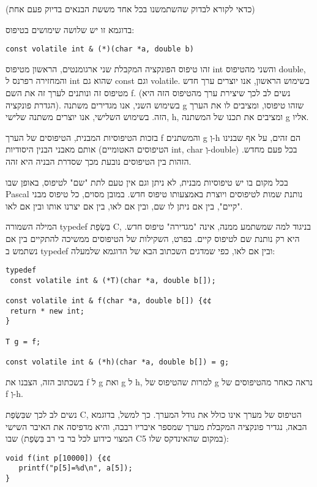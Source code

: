       (כדאי לקורא לבדוק שהשתמשנו בכל אחד מששת הבנאים בדיוק פעם אחת)

      בדוגמא זו יש שלושה שימושים בטיפוס:

\begin{verbatim}
const volatile int & (*)(char *a, double b)
\end{verbatim}

      זהו טיפוס הפונקציה המקבלת שני ארגומנטים, הראשון מטיפוס int והשני מהטיפוס double, והמחזירה רפרנס ל int שהוא גם const וגם volatile. בשימוש הראשון, אנו יוצרים ערך חדש מטיפוס זה ונותנים לערך זה את השם f. (נשים לב לכך שיצירת ערך מהטיפוס הזה היא הגדרת פונקציה). בשימוש השני, אנו מגדירים משתנה g שזהו טיפוסו, ומציבים לו את הערך הזה. בשימוש השלישי, אנו יוצרים משתנה שלישי, h, ומציבים את תכנו של המשתנה g אליו.

      בזכות הטיפוסיות המבנית, הטיפוסים של הערך f והמשתנים g וְ-h הם זהים, על אף שבנינו אותם מאבני הבנין היסודיות (הטיפוסים האטומיים int, char וְ-double) בכל פעם מחדש. הזהות בין הטיפוסים נובעת מכך שסדרת הבניה היא זהה.

      בכל מקום בו יש טיפוסיות מבנית, לא ניתן וגם אין טעם לתת "שם" לטיפוס, באופן שבו Pascal נותנת שמות לטיפוסים ויוצרת באמצעותו טיפוס חדש. במובן מסוים, כל טיפוס מבני "קיים", בין אם ניתן לו שם, ובין אם לאו, בין אם יצרנו אותו ובין אם לאו.

      המילה השמורה typedef בִּשְׂפַת C, בניגוד למה שמשתמע ממנה, אינה "מגדירה" טיפוס חדש. היא רק נותנת שם לטיפוס קיים. בפרט, השקילות של הטיפוסים ממשיכה להתקיים בין אם נשתמש ב typedef ובין אם לאו, כפי שמדגים השכתוב הבא של הדוגמא שלמעלה:

\begin{verbatim}
typedef
 const volatile int & (*T)(char *a, double b[]);

const volatile int & f(char *a, double b[]) {¢¢
 return * new int;
}

T g = f;

const volatile int & (*h)(char *a, double b[]) = g;
\end{verbatim}

      בשכתוב הזה, הצבנו את f ל g ואת g ל h, למרות שהטיפוס של g נראה כאחר מהטיפוסים של f וְ-h.

      נשים לב לכך שבִּשְׂפַת C, הטיפוס של מערך אינו כולל את גודל המערך. כך למשל, בדוגמא הבאה, נגדיר פונקציה המקבלת מערך שמספר איבריו רבבה, והיא מדפיסה את האיבר השישי שבו (המצוי כידוע לכל בר בי רב בִּשְׂפַת Cבמקום שהאינדקס שלו 5):

\begin{verbatim}
void f(int p[10000]) {¢¢
   printf("p[5]=%d\n", a[5]);
}
\end{verbatim}

